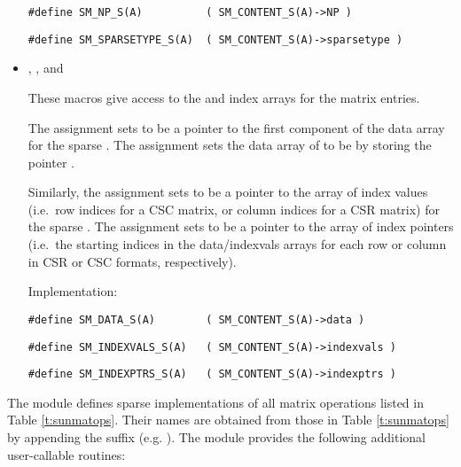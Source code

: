 \begin{itemize}
  \verb|#define SM_NP_S(A)          ( SM_CONTENT_S(A)->NP )|

  \verb|#define SM_SPARSETYPE_S(A)  ( SM_CONTENT_S(A)->sparsetype )|


\item {}, , and 
                                                            
  These macros give access to the  and index arrays for
  the matrix entries.

  The assignment  sets  to be     
  a pointer to the first component of the data array for the
  sparse  .  The assignment  sets the data array of  to be  by storing
  the pointer . 
  
  Similarly, the assignment 
  sets  to be a pointer to the array of index values
  (i.e.~row indices for a CSC matrix, or column indices for a CSR
  matrix) for the sparse  .  The
  assignment 
  sets  to be a pointer to the array of index
  pointers (i.e.~the starting indices in the data/indexvals arrays for
  each row or column in CSR or CSC formats, respectively).
  
  Implementation:

  \verb|#define SM_DATA_S(A)        ( SM_CONTENT_S(A)->data )|

  \verb|#define SM_INDEXVALS_S(A)   ( SM_CONTENT_S(A)->indexvals )|

  \verb|#define SM_INDEXPTRS_S(A)   ( SM_CONTENT_S(A)->indexptrs )|

\end{itemize}
The {\sunmatsparse} module defines sparse implementations of all matrix
operations listed in Table \ref{t:sunmatops}. Their names are obtained
from those in Table \ref{t:sunmatops} by appending the
suffix  (e.g. ). 
The module {\sunmatsparse} provides the following additional
user-callable routines: 
